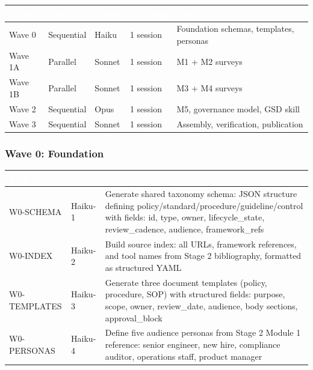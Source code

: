 \documentclass[11pt,letterpaper]{article}
\newcommand{\tableheader}[1]{\textbf{\sffamily\textcolor{white}{#1}}}
\begin{document}
\begin{center}
\begin{tabularx}{\textwidth}{L{2cm}L{2.5cm}L{2.5cm}L{2cm}X}
\toprule
{}
\tableheader{Wave} & \tableheader{Mode} & \tableheader{Model} & \tableheader{Duration} & \tableheader{Output} \\
\midrule
Wave 0 & Sequential & Haiku & 1 session & Foundation schemas, templates, personas \\
Wave 1A & Parallel & Sonnet & 1 session & M1 + M2 surveys \\
Wave 1B & Parallel & Sonnet & 1 session & M3 + M4 surveys \\
Wave 2 & Sequential & Opus & 1 session & M5, governance model, GSD skill \\
Wave 3 & Sequential & Sonnet & 1 session & Assembly, verification, publication \\
\bottomrule
\end{tabularx}
\end{center}

\subsubsection{Wave 0: Foundation}

\begin{center}
\begin{tabularx}{\textwidth}{L{3cm}L{2.5cm}X}
\toprule
{}
\tableheader{Task} & \tableheader{Agent} & \tableheader{Specification} \\
\midrule
W0-SCHEMA & Haiku-1 & Generate shared taxonomy schema: JSON structure defining policy/standard/procedure/guideline/control with fields: id, type, owner, lifecycle\_state, review\_cadence, audience, framework\_refs \\
W0-INDEX & Haiku-2 & Build source index: all URLs, framework references, and tool names from Stage 2 bibliography, formatted as structured YAML \\
W0-TEMPLATES & Haiku-3 & Generate three document templates (policy, procedure, SOP) with structured fields: purpose, scope, owner, review\_date, audience, body sections, approval\_block \\
W0-PERSONAS & Haiku-4 & Define five audience personas from Stage 2 Module 1 reference: senior engineer, new hire, compliance auditor, operations staff, product manager \\
\bottomrule
\end{tabularx}
\end{center}
\end{document}
